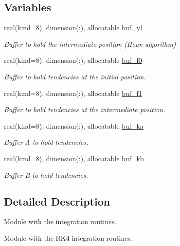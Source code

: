 \subsection*{Variables}
\begin{DoxyCompactItemize}
\item 
real(kind=8), dimension(\+:), allocatable \hyperlink{namespaceintegrator_ad82fcb5f12f76e9009ccd172f2ffa6b0}{buf\+\_\+y1}
\begin{DoxyCompactList}\small\item\em Buffer to hold the intermediate position (Heun algorithm) \end{DoxyCompactList}\item 
real(kind=8), dimension(\+:), allocatable \hyperlink{namespaceintegrator_aefe58ac9a698ca7d0440dcaf6103feea}{buf\+\_\+f0}
\begin{DoxyCompactList}\small\item\em Buffer to hold tendencies at the initial position. \end{DoxyCompactList}\item 
real(kind=8), dimension(\+:), allocatable \hyperlink{namespaceintegrator_acabd8820aca8c50aac234c5d404493b4}{buf\+\_\+f1}
\begin{DoxyCompactList}\small\item\em Buffer to hold tendencies at the intermediate position. \end{DoxyCompactList}\item 
real(kind=8), dimension(\+:), allocatable \hyperlink{namespaceintegrator_a2afa4ff98b4a081aab43a4fae62fc8b1}{buf\+\_\+ka}
\begin{DoxyCompactList}\small\item\em Buffer A to hold tendencies. \end{DoxyCompactList}\item 
real(kind=8), dimension(\+:), allocatable \hyperlink{namespaceintegrator_a6d3aa6db72a39f4bc0999ef8056ffba2}{buf\+\_\+kb}
\begin{DoxyCompactList}\small\item\em Buffer B to hold tendencies. \end{DoxyCompactList}\end{DoxyCompactItemize}


\subsection{Detailed Description}
Module with the integration routines. 

Module with the R\+K4 integration routines.

